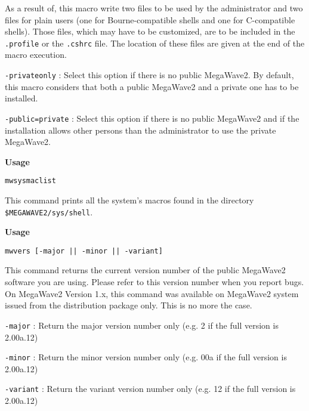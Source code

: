 As a result of, this macro write two files to be used by the administrator and two files
for plain users (one for Bourne-compatible shells and one for C-compatible shells). 
Those files, which may have to be customized, are to be included in the \verb+.profile+ or the 
\verb+.cshrc+ file. The location of these files are given at the end of the macro execution.

\Next

\Options

\verb+-privateonly+ : Select this option if there is no public MegaWave2.
By default, this macro considers that both a public MegaWave2 and a private one has to be installed.

\verb+-public=private+ : Select this option if there is no public MegaWave2 and if the installation 
allows other persons than the administrator to use the private MegaWave2. 

\newpage

{\Large\bf Usage} \bigskip

\verb+mwsysmaclist+

\Next

\Description
This command prints all the system's macros found in the directory \verb+$MEGAWAVE2/sys/shell+.
\newpage

{\Large\bf Usage} \bigskip

\verb+mwvers [-major || -minor || -variant]+

\Next

\Description

This command returns the current version number of the public MegaWave2 
software you are using. 
Please refer to this version number when you report bugs.
On MegaWave2 Version 1.x, this command was available on MegaWave2 system issued from the 
distribution package only. This is no more the case.
\Next

\Options

\verb+-major+ : Return the major version number only (e.g. 2 if the full version is 2.00a.12)

\verb+-minor+ : Return the minor version number only (e.g. 00a if the full version is 2.00a.12)

\verb+-variant+ : Return the variant version number only (e.g. 12 if the full version is 2.00a.12)

\newpage

